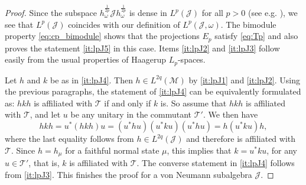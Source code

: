 \documentclass[12pt]{article}
\def\Me{\mathcal M}
\def\Je{\mathcal J}
\theoremstyle{definition}
\theoremstyle{remark}
\begin{document}
\begin{proof}
Since the subspace $h_\omega^{\frac1{2p}} \Je
h_\omega^{\frac1{2p}}$ is dense in $L^p(\Je)$ for all $p>0$ (see e.g. \cite[Lemma
A.1]{hiai2024alphaz}), we see that $L^p(\Je)$ coincides with our definition of
$L^p(\Je,\omega)$. The bimodule property \eqref{eq:cp_bimodule} shows that the
projections $E_p$ satisfy  \eqref{eq:Tp} and also proves  the statement \ref{it:lpJ5} in this case.
 Items \ref{it:lpJ2} and \ref{it:lpJ3} follow easily from the usual properties of Haagerup
$L_p$-spaces.  

Let $h$  and
$k$ be as in \ref{it:lpJ4}. Then $h\in L^{2q}(\Me)$ by \ref{it:lpJ1} and \ref{it:lpJ2}.
Using  the previous paragraphs, the statement of
\ref{it:lpJ4} can be equivalently formulated as:  $hkh$ is affiliated with $\mathcal T$
if and only if $k$ is. So assume that $hkh$ is affiliated with $\mathcal T$, and let $u$ be
any unitary in the commutant $\mathcal T'$. We then have
\[
hkh=u^*(hkh)u=(u^*hu)(u^*ku)(u^*hu)=h(u^*ku)h,
\]
where the last equality follows from $h\in L^{2q}(\Je)$ and therefore is affiliated with
$\mathcal T$. Since $h=h_\mu$ for a faithful normal state $\mu$, this implies that
$k=u^*ku$, for any $u\in \mathcal T'$, that is, {$k$ is affiliated with $\mathcal T$}. %
The converse statement in \ref{it:lpJ4} follows from \ref{it:lpJ3}.
This finishes the proof for a von Neumann subalgebra $\Je$.


\end{proof}
\end{document}
